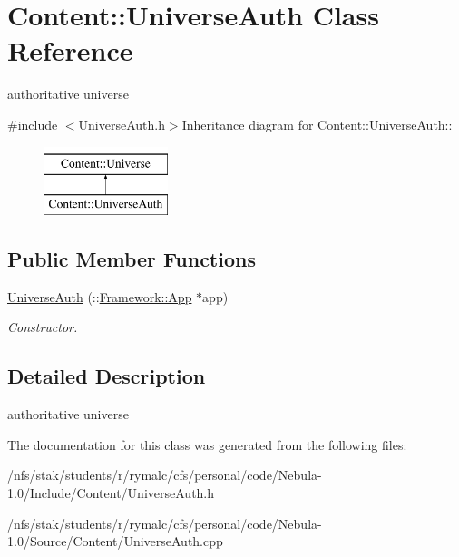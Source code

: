 \hypertarget{classContent_1_1UniverseAuth}{
\section{Content::UniverseAuth Class Reference}
\label{classContent_1_1UniverseAuth}
}


authoritative universe  


{\ttfamily \#include $<$UniverseAuth.h$>$}Inheritance diagram for Content::UniverseAuth::\begin{figure}[H]
\begin{center}
\leavevmode
\includegraphics[height=2cm]{classContent_1_1UniverseAuth}
\end{center}
\end{figure}
\subsection*{Public Member Functions}
\begin{DoxyCompactItemize}
\item 
\hypertarget{classContent_1_1UniverseAuth_a4e1f8cf5fbeefd7ade4b7126d462f61d}{
\hyperlink{classContent_1_1UniverseAuth_a4e1f8cf5fbeefd7ade4b7126d462f61d}{UniverseAuth} (::\hyperlink{classFramework_1_1App}{Framework::App} $\ast$app)}
\label{classContent_1_1UniverseAuth_a4e1f8cf5fbeefd7ade4b7126d462f61d}

\begin{DoxyCompactList}\small\item\em Constructor. \item\end{DoxyCompactList}\end{DoxyCompactItemize}


\subsection{Detailed Description}
authoritative universe 

The documentation for this class was generated from the following files:\begin{DoxyCompactItemize}
\item 
/nfs/stak/students/r/rymalc/cfs/personal/code/Nebula-\/1.0/Include/Content/UniverseAuth.h\item 
/nfs/stak/students/r/rymalc/cfs/personal/code/Nebula-\/1.0/Source/Content/UniverseAuth.cpp\end{DoxyCompactItemize}
